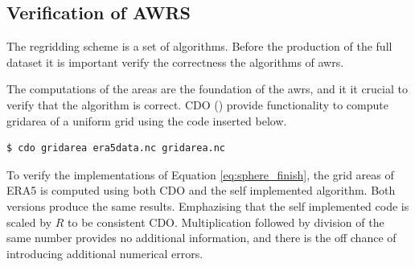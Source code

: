 \subsection{Verification of AWRS}
The regridding scheme is a set of algorithms. Before the production of the full dataset it is important verify the correctness the algorithms of \acrshort{awrs}.

The computations of the areas are the foundation of the \acrshort{awrs}, and it it crucial to verify that the algorithm is correct. CDO (\cite{cdo}) provide functionality to compute gridarea of a uniform grid using the code inserted below.
\begin{verbatim}
$ cdo gridarea era5data.nc gridarea.nc     
\end{verbatim}
To verify the implementations of Equation \eqref{eq:sphere_finish}, the grid areas of ERA5 is computed using both CDO and the self implemented algorithm. Both versions produce the same results.
Emphazising that the self implemented code is scaled by $R$ to be consistent CDO. Multiplication followed by division of the same number provides no additional information, and there is the off chance of introducing additional numerical errors. 

